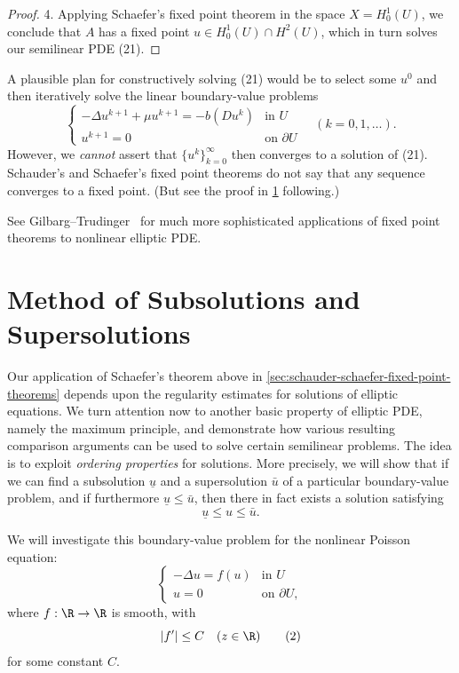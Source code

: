 \begin{proof}
4. Applying Schaefer's fixed point theorem in the space $X = H_0^1(U)$, we conclude that $A$ has a fixed point $u \in H_0^1(U) \cap H^2(U)$, which in turn solves our semilinear PDE (21).
\end{proof}

\begin{remark}
\label{rem:iteration-scheme-warning}
A plausible plan for constructively solving (21) would be to select some $u^0$ and then iteratively solve the linear boundary-value problems
\[
\begin{cases}
-\Delta u^{k+1} + \mu u^{k+1} = -b(Du^k) & \text{in } U \\
u^{k+1} = 0 & \text{on } \partial U
\end{cases} \quad (k = 0, 1, \ldots).
\]
However, we \textit{cannot} assert that $\{u^k\}_{k=0}^\infty$ then converges to a solution of (21). Schauder's and Schaefer's fixed point theorems do not say that any sequence converges to a fixed point. (But see the proof in \cref{sec:subsolutions-supersolutions} following.)
\end{remark}

See Gilbarg--Trudinger~\cite{GilbargTrudinger1983} for much more sophisticated applications of fixed point theorems to nonlinear elliptic PDE.

\section{Method of Subsolutions and Supersolutions}
\label{sec:subsolutions-supersolutions}

Our application of Schaefer's theorem above in \cref{sec:schauder-schaefer-fixed-point-theorems} depends upon the regularity estimates for solutions of elliptic equations. We turn attention now to another basic property of elliptic PDE, namely the maximum principle, and demonstrate how various resulting comparison arguments can be used to solve certain semilinear problems. The idea is to exploit \textit{ordering properties} for solutions. More precisely, we will show that if we can find a subsolution $\underline{u}$ and a supersolution $\bar{u}$ of a particular boundary-value problem, and if furthermore $\underline{u} \leq \bar{u}$, then there in fact exists a solution satisfying
\[
\underline{u} \leq u \leq \bar{u}.
\]

We will investigate this boundary-value problem for the nonlinear Poisson equation:
\[
\begin{cases}
-\Delta u = f(u) & \text{in } U \\
u = 0 & \text{on } \partial U,
\end{cases}
\tag{1}
\]
where $f : \R \to \R$ is smooth, with
\[
|f'| \leq C \quad (z \in \R)
\tag{2}
\]
for some constant $C$.

